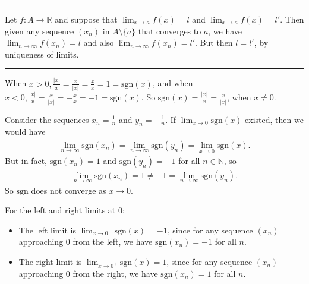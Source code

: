 \documentclass[letterpaper,10pt,english]{jupyterBook}
\begin{document}
\bigskip\hrule\bigskip


\sphinxAtStartPar
{\hyperref[\detokenize{Problems:id6}]{}} Let \(f:A\to \mathbb{R}\) and suppose that \(\lim_{x \rightarrow a} f(x) = l\) and \(\lim_{x \rightarrow a} f(x) = l'\). Then given any sequence \((x_{n})\) in \(A \setminus \{a\}\) that converges to \(a\), we have \(\lim_{n\rightarrow\infty} f(x_{n}) = l\) and also \(\lim_{n\rightarrow\infty} f(x_{n}) = l'\). But then \(l = l'\), by uniqueness of limits.


\bigskip\hrule\bigskip


\sphinxAtStartPar
{\hyperref[\detokenize{Problems:id7}]{}}
When \(x > 0, \displaystyle\frac{|x|}{x} = \displaystyle\frac{x}{|x|} = \displaystyle\frac{x}{x} = 1 = \text{sgn}(x)\), and when \(x < 0, \displaystyle\frac{|x|}{x} = \displaystyle\frac{x}{|x|} = -\displaystyle\frac{x}{x} = -1 = \text{sgn}(x)\). So \(\text{sgn}(x) = \displaystyle\frac{|x|}{x} = \displaystyle\frac{x}{|x|}\), when \(x\neq 0\).

Consider the sequences \(x_n=\frac{1}{n}\) and \(y_n=-\frac{1}{n}\). If \(\lim_{x\rightarrow 0}\text{sgn}(x)\) existed, then we would have
\begin{equation*}
\begin{split}
\lim_{n\rightarrow\infty}\text{sgn}(x_n)=\lim_{n\rightarrow\infty}\text{sgn}(y_n)=\lim_{x\rightarrow 0}\text{sgn}(x).
\end{split}
\end{equation*}
\sphinxAtStartPar
But in fact, \(\text{sgn}(x_n)=1\) and \(\text{sgn}(y_n)=-1\) for all \(n\in\mathbb{N}\), so
\begin{equation*}
\begin{split}
\lim_{n\rightarrow\infty}\text{sgn}(x_n)=1\neq-1=\lim_{n\rightarrow\infty}\text{sgn}(y_n).
\end{split}
\end{equation*}
\sphinxAtStartPar
So \(\text{sgn}\) does not converge as \(x\rightarrow 0\).

\sphinxAtStartPar
For the left and right limits at \(0\):
\begin{itemize}
\item {} 
\sphinxAtStartPar
The left limit is \(\displaystyle\lim_{x \rightarrow 0^-} \text{sgn}(x) = -1\), since for any sequence \((x_n)\) approaching \(0\) from the left, we have \(\text{sgn}(x_n) = -1\) for all \(n\).

\item {} 
\sphinxAtStartPar
The right limit is \(\displaystyle\lim_{x \rightarrow 0^+} \text{sgn}(x) = 1\),  since for any sequence \((x_n)\) approaching \(0\) from the right, we have \(\text{sgn}(x_n) = 1\) for all \(n\).

\end{itemize}
\end{document}

